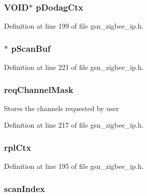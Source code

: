 \hypertarget{a00440_af31cb5b755e89e35cbdf543491bb5cc8}{
\subsubsection[{pDodagCtx}]{\setlength{\rightskip}{0pt plus 5cm}VOID$\ast$ {\bf pDodagCtx}}}
\label{a00440_af31cb5b755e89e35cbdf543491bb5cc8}


Definition at line 199 of file gsn\_\-zigbee\_\-ip.h.

\hypertarget{a00440_aa3af50125796e52b0890b911f8413313}{
\subsubsection[{pScanBuf}]{$\ast$ {\bf pScanBuf}}}
\label{a00440_aa3af50125796e52b0890b911f8413313}


Definition at line 221 of file gsn\_\-zigbee\_\-ip.h.

\hypertarget{a00440_acf6e868d8fc257d3844bc6e9a6e8608f}{
\subsubsection[{reqChannelMask}]{ {\bf reqChannelMask}}}
\label{a00440_acf6e868d8fc257d3844bc6e9a6e8608f}
Stores the channels requested by user 

Definition at line 217 of file gsn\_\-zigbee\_\-ip.h.

\hypertarget{a00440_a373ea62293885279791ea1559374aac8}{
\subsubsection[{rplCtx}]{ {\bf rplCtx}}}
\label{a00440_a373ea62293885279791ea1559374aac8}


Definition at line 195 of file gsn\_\-zigbee\_\-ip.h.

\hypertarget{a00440_a3524862c4c0985e934b9fa8c1dadd475}{
\subsubsection[{scanIndex}]{ {\bf scanIndex}}}
\label{a00440_a3524862c4c0985e934b9fa8c1dadd475}


